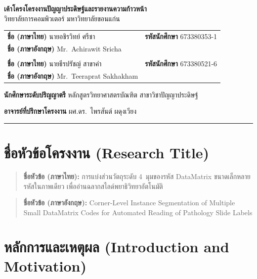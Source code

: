\documentclass[20pt,a4paper]{article}
\newcommand{\titleTH}{การแบ่งส่วนวัตถุระดับ 4~มุมของรหัส DataMatrix ขนาดเล็กหลายรหัสในภาพเดียว เพื่ออ่านฉลากสไลด์พยาธิวิทยาอัตโนมัติ}
\newcommand{\titleEN}{Corner-Level Instance Segmentation of Multiple Small DataMatrix Codes for Automated Reading of Pathology Slide Labels}
\newcommand{\firstStudentId}{673380353-1}
\newcommand{\firstStudentPrefixTH}{นาย}
\newcommand{\firstStudentNameTH}{อชิรวิทย์ ศรีชา}
\newcommand{\firstStudentPrefixEN}{Mr.}
\newcommand{\firstStudentNameEN}{Achirawit Sricha}
\newcommand{\secondStudentId}{673380521-6}
\newcommand{\secondStudentPrefixTH}{นาย}
\newcommand{\secondStudentNameTH}{ธีรปรัชญ์ สาขาคำ}
\newcommand{\secondStudentPrefixEN}{Mr.}
\newcommand{\secondStudentNameEN}{Teeraprat Sakhakham}
\newcommand{\major}{ปัญญาประดิษฐ์}
\newcommand{\advisor}{ผศ.ดร.~ไพรสันต์ ผดุงเวียง}
\begin{document}
\begin{center}
\Large
\textbf{เค้าโครงโครงงานปัญญาประดิษฐ์และรายงานความก้าวหน้า}
\\
\large
วิทยาลัยการคอมพิวเตอร์ มหาวิทยาลัยขอนแก่น
\end{center}

\noindent
\begin{tabular}{@{}p{}@{}@{}p{}@{}}
\\
\textbf{ชื่อ (ภาษาไทย)} \firstStudentPrefixTH\firstStudentNameTH
& \textbf{รหัสนักศึกษา} \firstStudentId
\\ \textbf{ชื่อ (ภาษาอังกฤษ)} \firstStudentPrefixEN\ \firstStudentNameEN  &
\\
 &
\\
\textbf{ชื่อ (ภาษาไทย)} \secondStudentPrefixTH\secondStudentNameTH
& \textbf{รหัสนักศึกษา} \secondStudentId
\\ \textbf{ชื่อ (ภาษาอังกฤษ)} \secondStudentPrefixEN\ \secondStudentNameEN  &
\\
\end{tabular}

\vspace{1em}
\noindent \textbf{นักศึกษาระดับปริญญาตรี} หลักสูตรวิทยาศาสตรบัณฑิต สาขาวิชา\major


\vspace{1em}
\noindent \textbf{อาจารย์ที่ปรึกษาโครงงาน} \advisor

\noindent\rule{\textwidth}{0.1pt}


\section{ชื่อหัวข้อโครงงาน (Research Title)}

\begin{quote}
\textbf{ชื่อหัวข้อ (ภาษาไทย):} \titleTH
\end{quote}

\begin{quote}
\textbf{ชื่อหัวข้อ (ภาษาอังกฤษ):} \titleEN
\end{quote}


\section{หลักการและเหตุผล
(Introduction and Motivation)}
\end{document}

